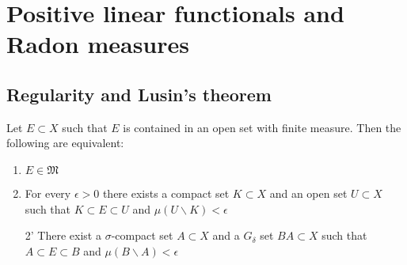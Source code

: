 \section{Positive linear functionals and Radon measures}
\setcounter{subsection}{3}
\subsection{Regularity and Lusin's theorem}
\setcounter{theorem}{28}
\begin{corollary}
    \label{equivalence of measure sets in Radon measure}
    Let  $ E\subset X $ such that  $ E $ is contained in an open set with finite measure. Then the following are equivalent:
    \begin{enumerate}
        \item  $ E\in \mathfrak{M}  $ 
        \item For every $ \epsilon>0  $ there exists a compact set  $ K\subset X  $ and an open set  $ U\subset X  $ such that  $ K\subset E\subset U $ and  $ \mu(U\backslash K)<\epsilon $ 
        \item[2'] There exist a  $ \sigma $-compact set  $ A\subset X $ and a  $ G_\delta $  set  $ BA\subset X $ such that  $ A\subset E\subset B $ and $ \mu(B \backslash A)<\epsilon $ 
    \end{enumerate}
\end{corollary}
